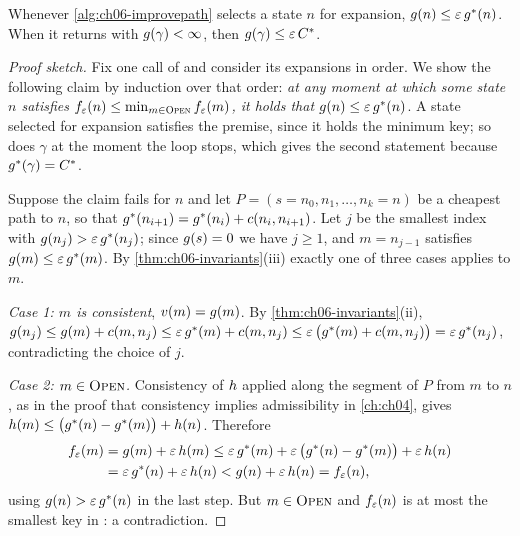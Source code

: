 \begin{theorem}
\label{thm:ch06-bound}
Whenever \cref{alg:ch06-improvepath} selects a state $n$ for expansion,
$g(n) \le \varepsilon\,g^*(n)$. When it returns with $g(\gamma) <
\infty$, then $g(\gamma) \le \varepsilon\,C^*$.
\end{theorem}
\begin{proof}[Proof sketch]
Fix one call of \AraImprovePath and consider its expansions in order. We show
the following claim by induction over that order: \emph{at any moment at which
some state $n$ satisfies $f_\varepsilon(n) \le \min_{m \in \text{\textsc{Open}}}
f_\varepsilon(m)$, it holds that $g(n) \le \varepsilon\,g^*(n)$}. A state
selected for expansion satisfies the premise, since it holds the minimum key;
so does $\gamma$ at the moment the loop stops, which gives the second
statement because $g^*(\gamma) = C^*$.

Suppose the claim fails for $n$ and let $P = (s = n_0, n_1, \dots, n_k = n)$
be a cheapest path to $n$, so that $g^*(n_{i+1}) = g^*(n_i) +
c(n_i, n_{i+1})$. Let $j$ be the smallest index with $g(n_j) > \varepsilon\,
g^*(n_j)$; since $g(s) = 0$ we have $j \ge 1$, and $m = n_{j-1}$
satisfies $g(m) \le \varepsilon\,g^*(m)$. By
\cref{thm:ch06-invariants}(iii) exactly one of three cases applies to $m$.

\emph{Case 1: $m$ is consistent}, $v(m) = g(m)$. By
\cref{thm:ch06-invariants}(ii), $g(n_j) \le g(m) + c(m, n_j) \le
\varepsilon\,g^*(m) + c(m, n_j) \le \varepsilon\,\bigl(g^*(m) + c(m, n_j)\bigr)
= \varepsilon\,g^*(n_j)$, contradicting the choice of $j$.

\emph{Case 2: $m \in \textsc{Open}$.} Consistency of $h$ applied along the
segment of $P$ from $m$ to $n$, as in the proof that consistency implies
admissibility in \cref{ch:ch04}, gives $h(m) \le \bigl(g^*(n) -
g^*(m)\bigr) + h(n)$. Therefore
\begin{align*}
  f_\varepsilon(m) &= g(m) + \varepsilon\,h(m)
  \le \varepsilon\,g^*(m) + \varepsilon\,\bigl(g^*(n) - g^*(m)\bigr) + \varepsilon\,h(n)\\
  &= \varepsilon\,g^*(n) + \varepsilon\,h(n)
  < g(n) + \varepsilon\,h(n) = f_\varepsilon(n),
\end{align*}
using $g(n) > \varepsilon\,g^*(n)$ in the last step. But $m \in \textsc{Open}$ and
$f_\varepsilon(n)$ is at most the smallest key in \Open: a contradiction.


\end{proof}
